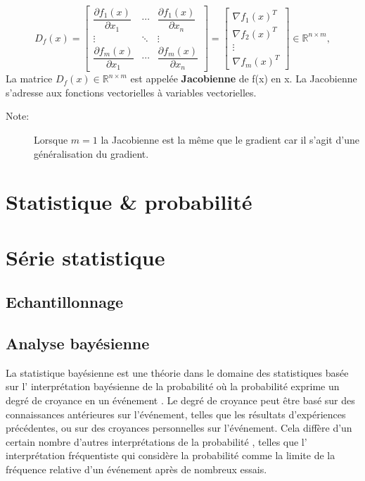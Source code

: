 	$$
	D_f\left(x\right)={
		\begin{bmatrix}
		{\dfrac {\partial f_{1}(x)}{\partial x_{1}}}&\cdots &{\dfrac {\partial f_{1}(x)}{\partial x_{n}}}\\
		\vdots &\ddots &\vdots \\
		{\dfrac {\partial f_{m}(x)}{\partial x_{1}}}&\cdots &{\dfrac {\partial f_{m}(x)}{\partial x_{n}}}
		\end{bmatrix}}
		=
		\begin{bmatrix}
		\nabla f_1(x)^T \\ \nabla f_2(x)^T\\ \vdots \\ \nabla f_m(x)^T
		\end{bmatrix}
		\in  \mathbb{R}^{n \times m},
	$$
	La matrice $D_f (x) \in  \mathbb{R}^{n \times m} $ est appelée \textbf{Jacobienne} de f(x) en x.
	La Jacobienne s’adresse aux fonctions vectorielles à variables vectorielles.
	
	
	
		
		
	\begin{description}
		\item[Note:] Lorsque $m=1$ la Jacobienne est la même que le gradient car il s'agit d'une généralisation du gradient.
	\end{description}
	
		
		
		
	\section{Statistique \& probabilité}
	\section{Série statistique}
		\lipsum[1]
	\subsection{Echantillonnage}
		\lipsum[1]
		
	\subsection{Analyse bayésienne}
		La statistique bayésienne est une théorie dans le domaine des statistiques basée sur l' interprétation bayésienne de la probabilité où la probabilité exprime un degré de croyance en un événement . Le degré de croyance peut être basé sur des connaissances antérieures sur l'événement, telles que les résultats d'expériences précédentes, ou sur des croyances personnelles sur l'événement. Cela diffère d'un certain nombre d'autres interprétations de la probabilité , telles que l' interprétation fréquentiste qui considère la probabilité comme la limite de la fréquence relative d'un événement après de nombreux essais.
		

